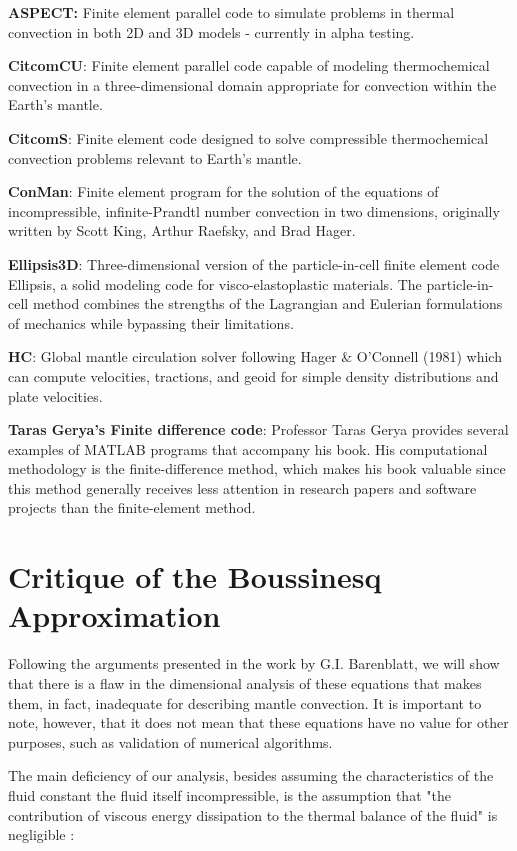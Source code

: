 \documentclass[
10pt, %
a4paper, %
oneside, %
headinclude,footinclude, %
BCOR5mm, %
]{scrartcl}
\begin{document}
\textbf{ASPECT:} Finite element parallel code to simulate problems in thermal convection in both 2D and 3D models - currently in alpha testing.

\textbf{CitcomCU}: Finite element parallel code capable of modeling thermochemical convection in a three-dimensional domain appropriate for convection within the Earth's mantle. 

\textbf{CitcomS}: Finite element code designed to solve compressible thermochemical convection problems relevant to Earth's mantle.

\textbf{ConMan}: Finite element program for the solution of the equations of incompressible, infinite-Prandtl number convection in two dimensions, originally written by Scott King, Arthur Raefsky, and Brad Hager.

\textbf{Ellipsis3D}: Three-dimensional version of the particle-in-cell finite element code Ellipsis, a solid modeling code for visco-elastoplastic materials. The particle-in-cell method combines the strengths of the Lagrangian and Eulerian formulations of mechanics while bypassing their limitations.

\textbf{HC}: Global mantle circulation solver following Hager \& O'Connell (1981) which can compute velocities, tractions, and geoid for simple density distributions and plate velocities. 

\textbf{Taras Gerya's Finite difference code}: Professor Taras Gerya \cite{gerya} provides several examples of MATLAB programs that accompany his book. His computational methodology is the finite-difference method, which makes his book valuable since this method generally receives less attention in research papers and software projects than the finite-element method.

\section{Critique of the Boussinesq Approximation}

Following the arguments presented in the work \cite{barenblatt1} by G.I. Barenblatt, we will show that there is a flaw in the dimensional analysis of these equations that makes them, in fact, inadequate for describing mantle convection. It is important to note, however, that it does not mean that these equations have no value for other purposes, such as validation of numerical algorithms.

The main deficiency of our analysis, besides assuming the characteristics of the fluid constant the fluid itself incompressible, is the assumption that "the contribution of viscous energy dissipation to the thermal balance of the fluid" is negligible \cite[p. 545]{boussinesq_validity}:
\end{document}
